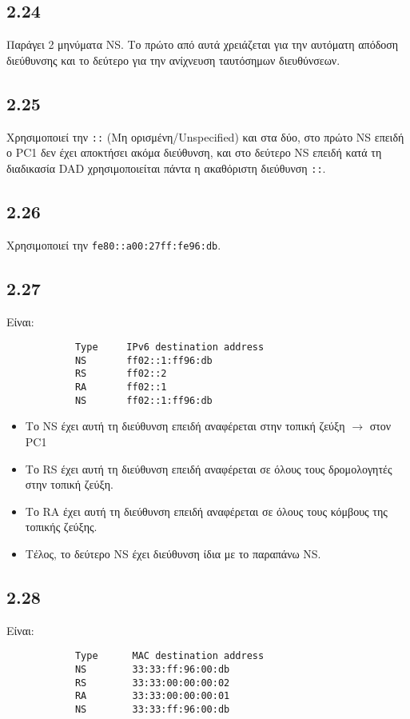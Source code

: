 \documentclass[a4paper, 12pt]{article}
\begin{document}
	\subsection*{2.24}
		Παράγει 2 μηνύματα NS. Το πρώτο από αυτά χρειάζεται για την αυτόματη απόδοση διεύθυνσης και το δεύτερο για την ανίχνευση ταυτόσημων διευθύνσεων.

	\subsection*{2.25}
		Χρησιμοποιεί την \verb|::| (Μη ορισμένη/Unspecified) και στα δύο, στο πρώτο NS επειδή ο PC1 δεν έχει αποκτήσει ακόμα διεύθυνση, και στο δεύτερο NS επειδή κατά τη διαδικασία DAD χρησιμοποιείται πάντα η ακαθόριστη διεύθυνση \verb|::|.

	\subsection*{2.26}
		Χρησιμοποιεί την \verb|fe80::a00:27ff:fe96:db|.

	\subsection*{2.27} 
		Είναι:
		
		\begin{verbatim}
			Type     IPv6 destination address
			NS       ff02::1:ff96:db
			RS       ff02::2
			RA       ff02::1
			NS       ff02::1:ff96:db
		\end{verbatim}

		\begin{itemize}
			\item Το NS έχει αυτή τη διεύθυνση επειδή αναφέρεται στην τοπική ζεύξη $\rightarrow$ στον PC1
			\item Το RS έχει αυτή τη διεύθυνση επειδή αναφέρεται σε όλους τους δρομολογητές στην τοπική ζεύξη.
			\item Το RA έχει αυτή τη διεύθυνση επειδή αναφέρεται σε όλους τους κόμβους της τοπικής ζεύξης.
			\item Τέλος, το δεύτερο NS έχει διεύθυνση ίδια με το παραπάνω NS.
		\end{itemize}

	\subsection*{2.28}
		Είναι:
		
		\begin{verbatim}
			Type      MAC destination address
			NS        33:33:ff:96:00:db
			RS        33:33:00:00:00:02
			RA        33:33:00:00:00:01
			NS        33:33:ff:96:00:db
		\end{verbatim}
		
\end{document}
